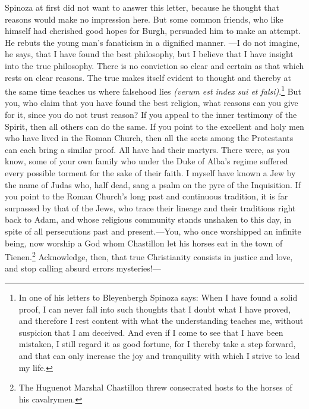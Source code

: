 \documentclass[12pt]{book}
\newcommand{\opage}[1]{\marginnote{\footnotesize\textit{[#1]}}}
\begin{document}
Spinoza at first did not want to answer this letter, because he thought that reasons
would make no impression here. But some common friends, who like himself had cherished
good hopes for Burgh, persuaded him to make an attempt. He rebuts the young man's
fanaticism in a dignified manner. \opage{62}---I do not imagine, he says, that I have
found the best philosophy, but I believe that I have insight into the true philosophy.
There is no conviction so clear and certain as that which rests on clear reasons. The
true makes itself evident to thought and thereby at the same time teaches us where
falsehood lies \textit{(verum est index sui et falsi)}.\footnote{In one of his letters
to Bleyenbergh Spinoza says: When I have found a solid proof, I can never fall into such
thoughts that I doubt what I have proved, and therefore I rest content with what the
understanding teaches me, without suspicion that I am deceived. And even if I come to
see that I have been mistaken, I still regard it as good fortune, for I thereby take a
step forward, and that can only increase the joy and tranquility with which I strive to
lead my life.} But you, who claim that you have found the best religion, what reasons
can you give for it, since you do not trust reason? If you appeal to the inner
testimony of the Spirit, then all others can do the same. If you point to the
excellent and holy men who have lived in the Roman Church, then all the sects among the
Protestants can each bring a similar proof. All have had their martyrs. There were, as
you know, some of your own family who under the Duke of Alba's regime suffered every
possible torment for the sake of their faith. I myself have known a Jew by the name of
Judas who, half dead, sang a psalm on the pyre of the Inquisition. If you point to the
Roman Church's long past and continuous tradition, it is far surpassed by that of the
Jews, who trace their lineage and their traditions right back to Adam, and whose
religious community stands unshaken to \opage{63}this day, in spite of all persecutions
past and present.---You, who once worshipped an infinite being, now worship a God whom
Chastillon let his horses eat in the town of Tienen.\footnote{The Huguenot Marshal
Chastillon threw consecrated hosts to the horses of his cavalrymen.} Acknowledge, then,
that true Christianity consists in justice and love, and stop calling absurd errors
mysteries!---
\end{document}
